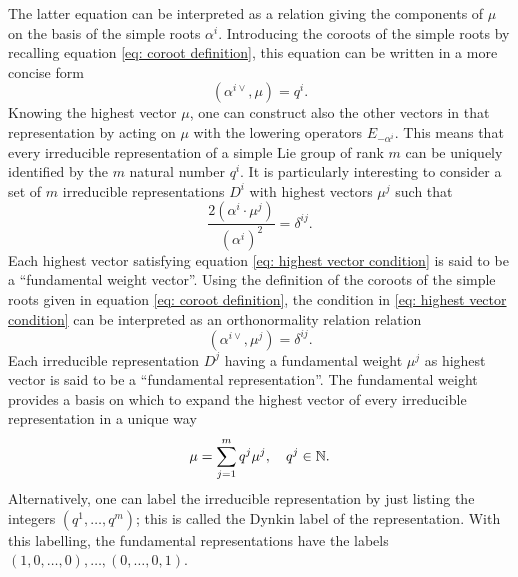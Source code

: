 The latter equation can be interpreted as a relation giving the components of $\mu$ on the basis of the simple roots $\alpha^i$. Introducing the coroots of the simple roots by recalling equation \eqref{eq: coroot definition}, this equation can be written in a more concise form
\begin{equation}
    (\alpha^{i\vee},\mu) = q^i.
\end{equation}
Knowing the highest vector $\mu$, one can construct also the other vectors in that representation by acting on $\mu$ with the lowering operators $E_{-\alpha^i}$. This means that every irreducible representation of a simple Lie group of rank $m$ can be uniquely identified by the $m$ natural number $q^i$. It is particularly interesting to consider a set of $m$ irreducible representations $D^i$ with highest vectors $\mu^j$ such that
\begin{equation}
\label{eq: highest vector condition}
    \frac{2(\alpha^i \cdot \mu^j)}{(\alpha^i)^2} = \delta^{ij}.
\end{equation}
Each highest vector satisfying equation \eqref{eq: highest vector condition} is said to be a ``fundamental weight vector''. Using the definition of the coroots of the simple roots given in equation \eqref{eq: coroot definition}, the condition in \eqref{eq: highest vector condition} can be interpreted as an orthonormality relation relation 
\begin{equation}
    (\alpha^{i\vee},\mu^j) = \delta^{ij}.
\end{equation}
Each irreducible representation $D^j$ having a fundamental weight $\mu^j$ as highest vector is said to be a ``fundamental representation''. The fundamental weight provides a basis on which to expand the highest vector of every irreducible representation in a unique way
\begin{equation}
    \mu = \sum_{j=1}^m q^j\mu^j,\quad q^j \in \mathbb{N}.
\end{equation}
Alternatively, one can label the irreducible representation by just listing the integers $(q^1,\dots,q^m)$; this is called the Dynkin label of the representation. With this labelling, the fundamental representations have the labels $(1,0,\dots,0),\dots,(0,\dots,0,1)$.

